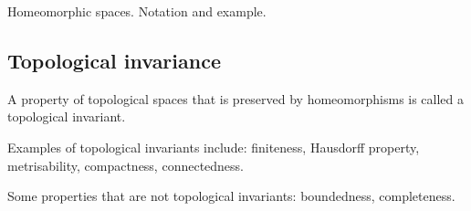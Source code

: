 Homeomorphic spaces. Notation and example.



\subsection{Topological invariance}
\begin{ndfn}
  A property of topological spaces that is preserved by homeomorphisms is called a topological invariant.
\end{ndfn}

Examples of topological invariants include: finiteness, Hausdorff property, metrisability, compactness, connectedness.

Some properties that are not topological invariants: boundedness, completeness.

